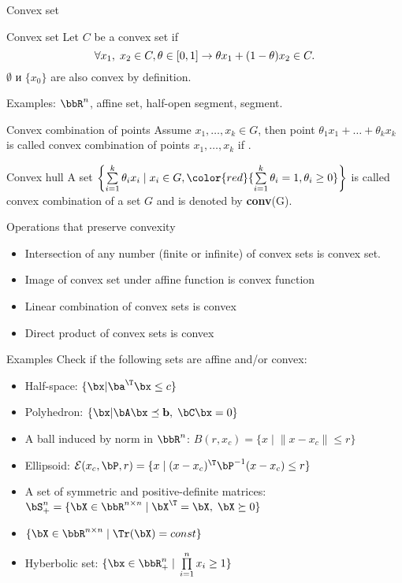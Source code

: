 \documentclass[12pt,russian]{beamer}
\begin{document}
\begin{frame}{Convex set}
\small
\begin{block}{Convex set}
Let $C$ be a convex set if 
\vspace{-4mm}
\[
\forall x_1, \; x_2 \in C, \theta \in [0, 1] \rightarrow \theta x_1 + (1 - \theta)x_2 \in C.
\vspace{-4mm}
\]
$\emptyset$ и $\{ x_0 \}$ are also convex by definition.
\end{block}
Examples: $\bbR^n$, affine set, half-open segment, segment.

\begin{block}{Convex combination of points}
Assume $x_1, \ldots, x_k \in G$, then point $\theta_1 x_1 + \ldots + \theta_k x_k$ is called convex combination of points $x_1,\ldots,x_k$ if {}.
\end{block}

\begin{block}{Convex hull}
A set $\left\{ \sum\limits_{i=1}^k \theta_i x_i \; | \; x_i \in G, {\color{red}{\sum\limits_{i=1}^k \theta_i = 1, \theta_i \geq 0}} \right\}$ is called convex combination of a set $G$ and is denoted by \textbf{conv}(G).
\end{block}

\end{frame}

\begin{frame}{Operations that preserve convexity}
\begin{itemize}
\item Intersection of any number (finite or infinite) of convex sets is convex set.
\item Image of convex set under affine function is convex function
\item Linear combination of convex sets is convex
\item Direct product of convex sets is convex
\end{itemize}
\end{frame}

\begin{frame}{Examples}
Check if the following sets are affine and/or convex:
\begin{itemize}
\item Half-space: $\{ \bx | \ba^{\T} \bx \leq c \}$
\item Polyhedron: $\{ \bx | \bA\bx \preceq \mathbf{b}, \; \bC\bx = 0 \}$
\item A ball induced by norm in $\bbR^n$: $B(r, x_c) = \{ x \; | \; \| x - x_c \| \leq r \}$
\item Ellipsoid: $\mathcal{E}(x_c, \bP, r) = \{ x \; | \; (x - x_c)^{\T}\bP^{-1} (x - x_c) \leq r \}$
\item A set of symmetric and positive-definite matrices: $\bS^n_+ = \{ \bX \in \bbR^{n \times n} \; | \; \bX^{\T} = \bX, \; \bX \succeq 0 \}$
\item $\{ \bX \in \bbR^{n \times n} \; | \; \Tr(\bX) = const \}$
\item Hyberbolic set: $\{ \bx \in \bbR^n_+ \; | \; \prod\limits_{i=1}^n x_i \geq 1 \}$
\end{itemize}
\end{frame}
\end{document}
